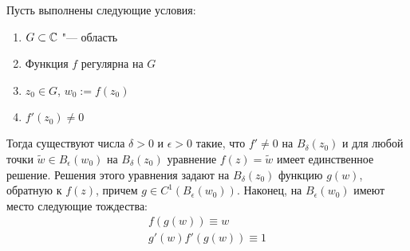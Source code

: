 \begin{theorem}
	Пусть выполнены следующие условия:
	\begin{enumerate}
		\item $G \subset \mathbb{C}$ "--- область
		\item Функция $f$ регулярна на $G$
		\item $z_0 \in G$, $w_0 := f(z_0)$
		\item $f'(z_0) \ne 0$
	\end{enumerate}

	Тогда существуют числа $\delta > 0$ и $\epsilon > 0$ такие, что $f' \ne 0$ на $B_\delta(z_0)$ и для любой точки $\widetilde w \in B_\epsilon(w_0)$ на $B_\delta(z_0)$ уравнение $f(z) = \widetilde w$ имеет единственное решение. Решения этого уравнения задают на $B_\delta(z_0)$ функцию $g(w)$, обратную к $f(z)$, причем $g \in C^1(B_\epsilon(w_0))$. Наконец, на $B_\epsilon(w_0)$ имеют место следующие тождества:
	\vspace{-6pt}
	\begin{gather*}
		f(g(w)) \equiv w \\ g'(w)f'(g(w)) \equiv 1
	\end{gather*}
\end{theorem}

